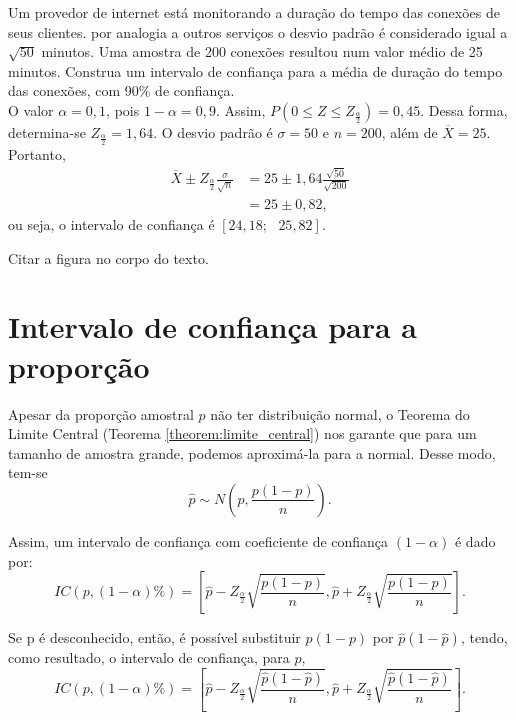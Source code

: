 \documentclass[11pt,fleqn]{book}
\numberwithin{mpicture}{chapter}
\numberwithin{mtable}{chapter}
\numberwithin{mframe}{chapter}
\begin{document}
\begin{example}
	\label{example:ic_media_variancia_conhecida}
	Um provedor de internet está monitorando a duração do tempo das conexões de seus clientes. por analogia a outros serviços o desvio padrão é considerado igual a $\sqrt{50}$ minutos. Uma amostra de 200 conexões resultou num valor médio de 25 minutos. Construa um intervalo de confiança para a média de duração do tempo das conexões, com 90\% de confiança.\\
	
	O valor $\alpha=0,1$, pois $1-\alpha=0,9$. Assim, $P(0\leqslant Z \leqslant Z_{\frac{\alpha}{2}})=0,45$. Dessa forma, determina-se $Z_{\frac{\alpha}{2}}=1,64$. O desvio padrão é $\sigma=50$ e $n=200$, além de $\overline{X}=25$. Portanto,
	\begin{align*}
		\overline{X}\pm Z_{\frac{\alpha}{2}}\frac{\sigma}{\sqrt{n}} &= 25\pm 1,64\frac{\sqrt{50}}{\sqrt{200}}\\
																	  &= 25\pm 0,82\text{,}
	\end{align*}
	ou seja, o intervalo de confiança é $[24,18;\text{ }25,82]$.
\end{example}

{\color{red}Citar a figura no corpo do texto.}

\section{Intervalo de confiança para a proporção}

Apesar da proporção amostral $\hat{p}$ não ter distribuição normal, o Teorema do Limite Central (Teorema \ref{theorem:limite_central}) nos garante que para um tamanho de amostra grande, podemos aproximá-la para a normal. Desse modo, tem-se
\[
	\hat{p}\sim N\left ( p, \frac{p(1-p)}{n} \right )
	\text{.}
\]

Assim, um intervalo de confiança com coeficiente de confiança $(1-\alpha)$ é dado por:
\[
	IC(p,  (1-\alpha)\%) = \left [
		\hat{p} - Z_{\frac{\alpha}{2}} \sqrt{ \frac{p(1-p)}{n} }
		,
		\hat{p} + Z_{\frac{\alpha}{2}} \sqrt{ \frac{p(1-p)}{n} }
	\right ]
	\text{.}
\]

Se p é desconhecido, então, é possível substituir $p(1-p)$ por $\hat{p}(1-\hat{p})$, tendo, como resultado, o intervalo de confiança, para $p$, 
\[
	IC(p,  (1-\alpha)\%) = \left [
		\hat{p} - Z_{\frac{\alpha}{2}} \sqrt{ \frac{\hat{p}(1-\hat{p})}{n} }
		,
		\hat{p} + Z_{\frac{\alpha}{2}} \sqrt{ \frac{\hat{p}(1-\hat{p})}{n} }
	\right ]
	\text{.}
\]
\end{document}
